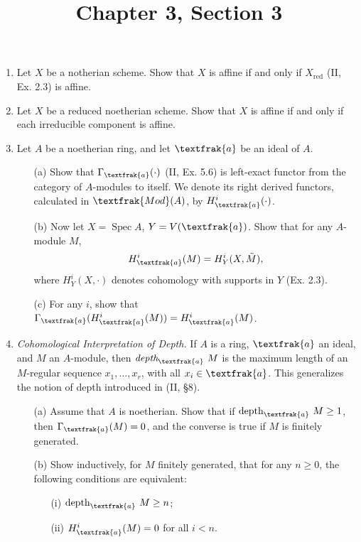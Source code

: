 \documentclass{article}
\title{Chapter 3, Section 3}
\newcommand{\goth}[1]{\textfrak{#1}}
\DeclareMathOperator{\spec}{Spec}
\begin{document}
\maketitle
\begin{enumerate} [label=\textbf{\arabic*.}, leftmargin=0em]

\item Let $X$ be a notherian scheme. Show that $X$ is affine if and only if $X_\text{red}$ (II, Ex. 2.3) is affine.

\item Let $X$ be a reduced noetherian scheme. Show that $X$ is affine if and only if each irreducible component is affine.

\item Let $A$ be a noetherian ring, and let $\goth{a}$ be an ideal of $A$.
\begin{itemize}
  \item[(a)] Show that $\Gamma_\goth{a}(\cdot)$ (II, Ex. 5.6) is left-exact functor from the category of $A$-modules to itself. We denote its right derived functors, calculated in $\goth{Mod}(A)$, by $H_\goth{a}^i(\cdot)$.
  \item[(b)] Now let $X = \spec{A}$, $Y = V(\goth{a})$. Show that for any $A$-module $M$,
  \begin{equation*}
    H_\goth{a}^i(M) = H_Y^i(X, \tilde{M}),
  \end{equation*}
  where $H_Y^i(X, \cdot)$ denotes cohomology with supports in $Y$ (Ex. 2.3).
  \item[(c)] For any $i$, show that $\Gamma_\goth{a}(H_\goth{a}^i(M)) = H_\goth{a}^i(M)$.
\end{itemize}

\item \textit{Cohomological Interpretation of Depth.} If $A$ is a ring, $\goth{a}$ an ideal, and $M$ an $A$-module, then $\textit{depth}_\goth{a}~M$ is the maximum length of an $M$-regular sequence $x_1, \dots, x_r$, with all $x_i \in \goth{a}$. This generalizes the notion of depth introduced in (II, \S 8).
\begin{itemize}
  \item[(a)] Assume that $A$ is noetherian. Show that if $\text{depth}_\goth{a}~M \geq 1$, then $\Gamma_\goth{a}(M) = 0$, and the converse is true if $M$ is finitely generated.
  \item[(b)] Show inductively, for $M$ finitely generated, that for any $n \geq 0$, the following conditions are equivalent:
  \begin{itemize}
    \item[(i)] $\text{depth}_\goth{a}~M \geq n$;
    \item[(ii)] $H_\goth{a}^i(M) = 0$ for all $i < n$.
  \end{itemize}
\end{itemize}


\end{enumerate}
\end{document}

